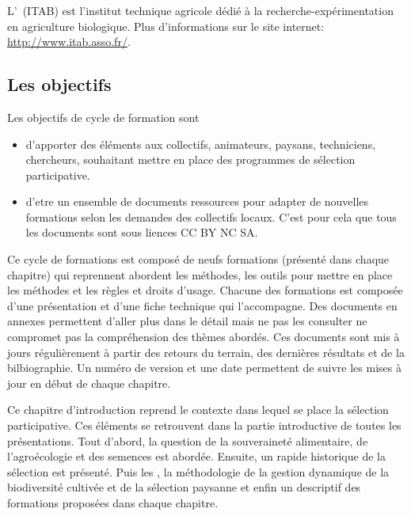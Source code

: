 \subsubsection{\ITAB}
L'\ITAB~(ITAB) est l'institut technique agricole dédié à la recherche-expérimentation en agriculture biologique.
Plus d'informations sur le site internet: \url{http://www.itab.asso.fr/}.


\subsection{Les objectifs}
Les objectifs de cycle de formation sont

\begin{itemize}
\item d'apporter des éléments aux collectifs, animateurs, paysans, techniciens, chercheurs, souhaitant mettre en place des programmes de sélection participative.
\item d'etre un ensemble de documents ressources pour adapter de nouvelles formations selon les demandes des collectifs locaux. C'est pour cela que tous les documents sont sous liences CC BY NC SA.
\end{itemize}

Ce cycle de formations est composé de neufs formations (présenté dans chaque chapitre) qui reprennent abordent les méthodes, les outils pour mettre en place les méthodes et les règles et droits d’usage.
Chacune des formations est composée d’une présentation et d’une fiche technique qui l’accompagne. 
Des documents en annexes permettent d’aller plus dans le détail mais ne pas les consulter ne
compromet pas la compréhension des thèmes abordés. 
Ces documents sont mis à jours régulièrement à partir des retours du terrain, des dernières résultats et de la bilbiographie. 
Un numéro de version et une date permettent de suivre les mises à jour en début de chaque chapitre.

Ce chapitre d'introduction reprend le contexte dans lequel se place la sélection participative.
Ces éléments se retrouvent dans la partie introductive de toutes les présentations.
Tout d'abord, la question de la souveraineté alimentaire, de l'agroécologie et des semences est abordée.
Ensuite, un rapide historique de la sélection est présenté.
Puis les \MSPs, 
la méthodologie de la gestion dynamique de la biodiversité cultivée et de la sélection paysanne et enfin
un descriptif des formations proposées dans chaque chapitre.

